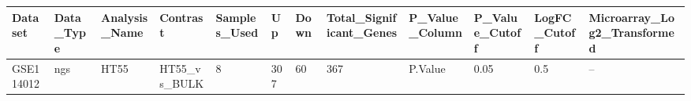 \begingroup
\tiny
\setlength{\tabcolsep}{2pt}
\renewcommand{\arraystretch}{1.18}
\begin{tabular}{@{}llllllllllll@{}}
\toprule
Dataset & Data\_Type & Analysis\_Name & Contrast & Samples\_Used & Up & Down & Total\_Significant\_Genes & P\_Value\_Column & P\_Value\_Cutoff & LogFC\_Cutoff & Microarray\_Log2\_Transformed \\
\midrule
GSE114012 & ngs & HT55 & HT55\_vs\_BULK & 8 & 307 & 60 & 367 & P.Value & 0.05 & 0.5 & -- \\
\bottomrule
\end{tabular}
\endgroup
